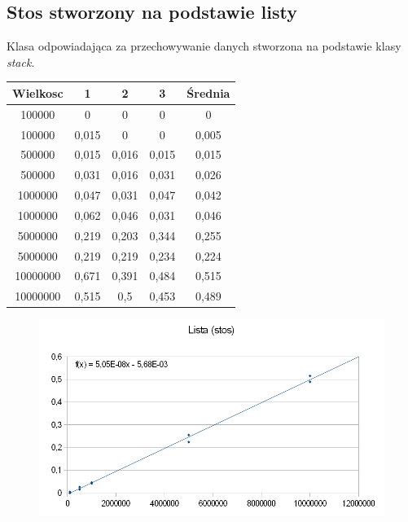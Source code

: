 \documentclass[12pt,a4paper,titlepage]{article}
\begin{document}
\subsection{Stos stworzony na podstawie listy}
Klasa odpowiadająca za przechowywanie danych stworzona na podstawie klasy \textit{stack}. 
\begin{center}
\begin {tabular}{|c|c|c|c|c|}\hline
Wielkosc & 1 & 2 & 3 & Średnia \\\hline
100000&0&0&0&0 \\\hline
100000&0,015&0&0&0,005 \\\hline
500000&0,015&0,016&0,015&0,015 \\\hline
500000&0,031&0,016&0,031&0,026 \\\hline
1000000&0,047&0,031&0,047&0,042 \\\hline
1000000&0,062&0,046&0,031&0,046 \\\hline
5000000&0,219&0,203&0,344&0,255 \\\hline
5000000&0,219&0,219&0,234&0,224 \\\hline
10000000&0,671&0,391&0,484&0,515 \\\hline
10000000&0,515&0,5&0,453&0,489 \\\hline
\end{tabular}
\end {center}
\begin{figure}[h]
\begin{center}
\includegraphics[scale=0.5]{Lista_(stos).png}
\end{center}
\end{figure}

\newpage
\end{document}
